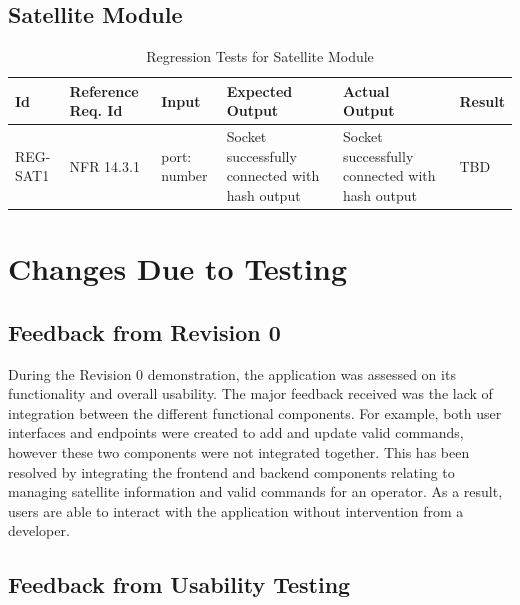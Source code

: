 \documentclass[12pt, titlepage]{article}
\begin{document}
\subsection{Satellite Module}
\begin{center}
\begin{longtable}{|p{1cm} | p{2cm} |p{2cm}| p{2cm} |p{2cm}| p{2cm}|}
\caption{Regression Tests for Satellite Module}
\hline
\textbf{Id} & \textbf{Reference Req. Id} & \textbf{Input} & \textbf{Expected Output} & \textbf{Actual Output} & \textbf{Result} \\
\hline
REG-SAT1 & NFR 14.3.1 & { port: number }
 & Socket successfully connected with hash output
 & Socket successfully connected with hash output & TBD
\\
\hline

\end{longtable}

\end{center}



\section{Changes Due to Testing}

\subsection{Feedback from Revision 0}

During the Revision 0 demonstration, the application was assessed on its functionality and overall usability. The major feedback received was the lack of integration between the different functional components. For example, both user interfaces and endpoints were created to add and update valid commands, however these two components were not integrated together. This has been resolved by integrating the frontend and backend components relating to managing satellite information and valid commands for an operator. As a result, users are able to interact with the application without intervention from a developer.

\subsection{Feedback from Usability Testing}
\end{document}
